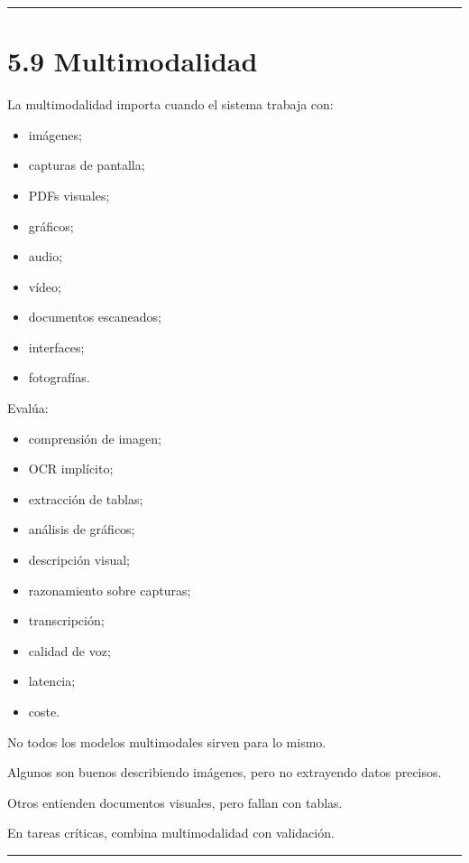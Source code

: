 \begin{center}\rule{0.5\linewidth}{0.5pt}\end{center}

\section{5.9 Multimodalidad}\label{multimodalidad-1}

La multimodalidad importa cuando el sistema trabaja con:

\begin{itemize}
\tightlist
\item
  imágenes;
\item
  capturas de pantalla;
\item
  PDFs visuales;
\item
  gráficos;
\item
  audio;
\item
  vídeo;
\item
  documentos escaneados;
\item
  interfaces;
\item
  fotografías.
\end{itemize}

Evalúa:

\begin{itemize}
\tightlist
\item
  comprensión de imagen;
\item
  OCR implícito;
\item
  extracción de tablas;
\item
  análisis de gráficos;
\item
  descripción visual;
\item
  razonamiento sobre capturas;
\item
  transcripción;
\item
  calidad de voz;
\item
  latencia;
\item
  coste.
\end{itemize}

No todos los modelos multimodales sirven para lo mismo.

Algunos son buenos describiendo imágenes, pero no extrayendo datos
precisos.

Otros entienden documentos visuales, pero fallan con tablas.

En tareas críticas, combina multimodalidad con validación.

\begin{center}\rule{0.5\linewidth}{0.5pt}\end{center}

